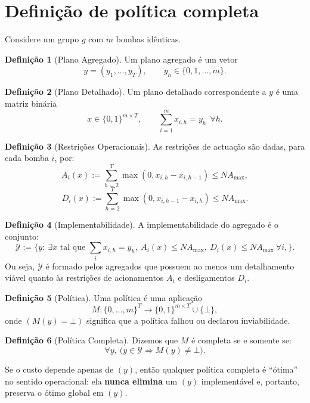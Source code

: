\documentclass{article}
\theoremstyle{definition}
\newtheorem{definition}{Definição}
\begin{document}
\section{Definição de política completa}

Considere um grupo $g$ com $m$ bombas idênticas.

\begin{definition}[Plano Agregado]
	Um plano agregado é um vetor
	\[
		y=(y_1,\dots,y_T),\qquad y_h\in\{0,1,\dots,m\}.
	\]
\end{definition}

\begin{definition}[Plano Detalhado]
	Um plano detalhado correspondente a $y$ é uma matriz binária
	\[
		x\in\{0,1\}^{m\times T},\qquad \sum_{i=1}^m x_{i,h}=y_h\ \ \forall h.
	\]
\end{definition}

\begin{definition}[Restrições Operacionais]
	As restrições de actuação são dadas, para cada bomba $i$, por:
	\[
		A_i(x):=\sum_{h=2}^T \max(0,x_{i,h}-x_{i,h-1})\le NA_{\max},
	\]
	\[
		D_i(x):=\sum_{h=2}^T \max(0,x_{i,h-1}-x_{i,h})\le NA_{\max}.
	\]
\end{definition}

\begin{definition}[Implementabilidade]
	A implementabilidade do agregado é o conjunto:
	\[
		\mathcal Y := \bigl\{ y:\ \exists x \text{ tal que } \sum_i x_{i,h}=y_h,\ A_i(x)\le NA_{\max},\ D_i(x)\le NA_{\max}\ \forall i,\bigr\}.
	\]
	Ou seja, $\mathcal Y$ é formado pelos agregados que possuem ao menos um detalhamento viável quanto às restrições de acionamentos $A_i$ e desligamentos $D_i$.
\end{definition}

\begin{definition}[Política]
	Uma política é uma aplicação
	\[
		M:\{0,\dots,m\}^T \to \{0,1\}^{m\times T}\cup\{\bot\},
	\]
	onde $(M(y)=\bot)$ significa que a política falhou ou declarou inviabilidade.
\end{definition}

\begin{definition}[Política Completa]
	Dizemos que $M$ é completa se e somente se:
	\[
		\forall y,\ \bigl(y\in\mathcal Y \Rightarrow M(y)\neq \bot\bigr).
	\]
\end{definition}

Se o custo depende apenas de $(y)$, então qualquer política completa é ``ótima'' no sentido operacional: ela \textbf{nunca elimina} um $(y)$ implementável e, portanto, preserva o ótimo global em $(y)$.
\end{document}
